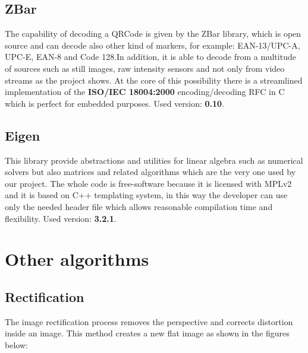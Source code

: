 \subsection{ZBar}

The capability of decoding a QRCode is given by the ZBar library, which is open source and can decode also other kind of markers, for example: EAN-13/UPC-A, UPC-E, EAN-8 and Code 128.In addition, it is able to decode from a multitude of sources such as still images, raw intensity sensors and not only from video streams as the project shows. At the core of this possibility there is a streamlined implementation of the \textbf{ISO/IEC 18004:2000} encoding/decoding RFC in C which is perfect for embedded purposes.
\newline Used version: \textbf{0.10}.

\subsection{Eigen}
This library provide abstractions and utilities for linear algebra such as numerical solvers but also matrices and related algorithms which are the very one used by our project.
The whole code is free-software because it is licensed with MPLv2 and it is based on C++ templating system, in this way the developer can use only the needed header file which allows reasonable compilation time and flexibility.\cite{eigeninfo}
\newline Used version: \textbf{3.2.1}.

\section{Other algorithms}

\subsection{Rectification}
The image rectification process removes the perspective and corrects distortion inside an image.
This method creates a new flat image as shown in the figures below:

